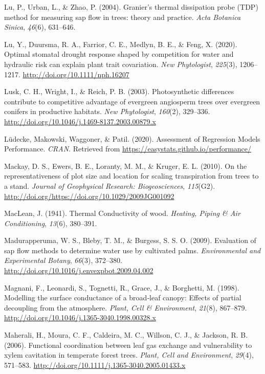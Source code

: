 \documentclass[11pt,twoside]{reedthesis}
\begin{document}
\hypertarget{ref-Lu2004}{}
Lu, P., Urban, L., \& Zhao, P. (2004). Granier's thermal dissipation
probe (TDP) method for measuring sap flow in trees: theory and practice.
\emph{Acta Botanica Sinica}, \emph{46}(6), 631--646.

\hypertarget{ref-lu_optimal_2020}{}
Lu, Y., Duursma, R. A., Farrior, C. E., Medlyn, B. E., \& Feng, X.
(2020). Optimal stomatal drought response shaped by competition for
water and hydraulic risk can explain plant trait covariation. \emph{New
Phytologist}, \emph{225}(3), 1206--1217.
\url{http://doi.org/10.1111/nph.16207}

\hypertarget{ref-lusk_photosynthetic_2003}{}
Lusk, C. H., Wright, I., \& Reich, P. B. (2003). Photosynthetic
differences contribute to competitive advantage of evergreen angiosperm
trees over evergreen conifers in productive habitats. \emph{New
Phytologist}, \emph{160}(2), 329--336.
\url{http://doi.org/10.1046/j.1469-8137.2003.00879.x}

\hypertarget{ref-ludecke_assessment_2020}{}
Lüdecke, Makowski, Waggoner, \& Patil. (2020). Assessment of Regression
Models Performance. \emph{CRAN}. Retrieved from
\url{https://easystats.github.io/performance/}

\hypertarget{ref-Mackay2010}{}
Mackay, D. S., Ewers, B. E., Loranty, M. M., \& Kruger, E. L. (2010). On
the representativeness of plot size and location for scaling
transpiration from trees to a stand. \emph{Journal of Geophysical
Research: Biogeosciences}, \emph{115}(G2).
\url{http://doi.org/https://doi.org/10.1029/2009JG001092}

\hypertarget{ref-MacLean1941}{}
MacLean, J. (1941). Thermal Conductivity of wood. \emph{Heating, Piping
\& Air Conditioning}, \emph{13}(6), 380--391.

\hypertarget{ref-Madurapperuma2009}{}
Madurapperuma, W. S., Bleby, T. M., \& Burgess, S. S. O. (2009).
Evaluation of sap flow methods to determine water use by cultivated
palms. \emph{Environmental and Experimental Botany}, \emph{66}(3),
372--380. \url{http://doi.org/10.1016/j.envexpbot.2009.04.002}

\hypertarget{ref-magnani_modelling_1998}{}
Magnani, F., Leonardi, S., Tognetti, R., Grace, J., \& Borghetti, M.
(1998). Modelling the surface conductance of a broad‐leaf canopy:
Effects of partial decoupling from the atmosphere. \emph{Plant, Cell \&
Environment}, \emph{21}(8), 867--879.
\url{http://doi.org/10.1046/j.1365-3040.1998.00328.x}

\hypertarget{ref-maherali_functional_2006}{}
Maherali, H., Moura, C. F., Caldeira, M. C., Willson, C. J., \& Jackson,
R. B. (2006). Functional coordination between leaf gas exchange and
vulnerability to xylem cavitation in temperate forest trees.
\emph{Plant, Cell and Environment}, \emph{29}(4), 571--583.
\url{http://doi.org/10.1111/j.1365-3040.2005.01433.x}
\end{document}
